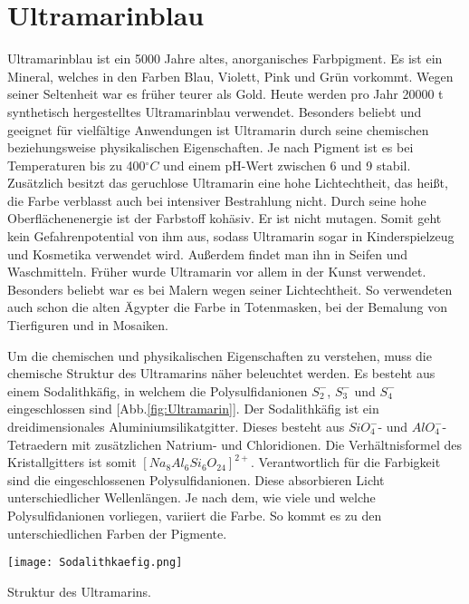 \section{Ultramarinblau}

Ultramarinblau ist ein 5000 Jahre altes, anorganisches Farbpigment. Es ist ein Mineral, welches in den Farben Blau, Violett, Pink und Grün vorkommt. Wegen seiner Seltenheit war es früher teurer als Gold. Heute werden pro Jahr 20000 t synthetisch hergestelltes Ultramarinblau verwendet.
Besonders beliebt und geeignet für vielfältige Anwendungen ist Ultramarin durch seine chemischen beziehungsweise physikalischen Eigenschaften. Je nach Pigment ist es bei Temperaturen bis zu 400$^{\circ}C$ und einem pH-Wert zwischen 6 und 9 stabil. Zusätzlich besitzt das geruchlose Ultramarin eine hohe Lichtechtheit, das heißt, die Farbe verblasst auch bei intensiver Bestrahlung nicht. Durch  seine hohe Oberflächenenergie ist der Farbstoff kohäsiv. Er ist nicht mutagen. Somit geht kein Gefahrenpotential von ihm aus, sodass Ultramarin sogar in Kinderspielzeug und Kosmetika verwendet wird. Außerdem findet man ihn  in Seifen und Waschmitteln. 
Früher wurde Ultramarin vor allem in der Kunst verwendet. Besonders beliebt war es bei Malern wegen seiner Lichtechtheit. So verwendeten auch schon die alten Ägypter die Farbe in Totenmasken, bei der Bemalung von Tierfiguren und in Mosaiken.

Um die chemischen und physikalischen Eigenschaften zu verstehen, muss die chemische Struktur des Ultramarins näher beleuchtet werden.
Es besteht aus einem Sodalithkäfig, in welchem die Polysulfidanionen $S_2^{-}$, $S_3^{-}$ und $S_4^{-}$ eingeschlossen sind [Abb.\ref{fig:Ultramarin}].
Der Sodalithkäfig ist ein dreidimensionales Aluminiumsilikatgitter. Dieses besteht aus $SiO_{4}^{-}$- und $AlO_{4}^{-}$-Tetraedern mit zusätzlichen Natrium- und Chloridionen. Die Verhältnisformel des Kristallgitters ist somit $[Na_{8}Al_{6}Si_{6}O_{24}]^{2+}$.
Verantwortlich für die Farbigkeit sind die eingeschlossenen Polysulfidanionen. Diese absorbieren Licht unterschiedlicher Wellenlängen. Je nach dem, wie viele und welche Polysulfidanionen vorliegen, variiert die Farbe. So kommt es zu den unterschiedlichen Farben der Pigmente. 

\begin{dsafigure}
 \centering
 \texttt{[image: Sodalithkaefig.png]}
 \caption{Struktur des Ultramarins.}
 \label{fig:Ultramarin}
\end{dsafigure}

